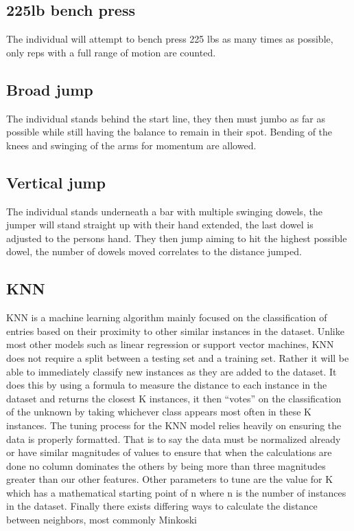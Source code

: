\documentclass[confrence]{IEEEtran}
\begin{document}
\subsection*{225lb bench press}
The individual will attempt to bench press 225 lbs as many times as possible, only reps with a full range of motion are counted.
\subsection*{Broad jump}
The individual stands behind the start line, they then must jumbo as far as possible while still having the balance to remain in their spot. Bending of the knees and swinging of the arms for momentum are allowed.
\subsection*{Vertical jump}
The individual stands underneath a bar with multiple swinging dowels, the jumper will stand straight up with their hand extended, the last dowel is adjusted to the persons hand. They then jump aiming to hit the highest possible dowel, the number of dowels moved correlates to the distance jumped.
\subsection*{KNN}
KNN is a machine learning algorithm mainly focused on the classification of entries based on their proximity to other similar instances in the dataset. 
Unlike most other models such as linear regression or support vector machines, KNN does not require a split between a testing set and a training set. 
Rather it will be able to immediately classify new instances as they are added to the dataset. 
It does this by using a formula to measure the distance to each instance in the dataset and returns the closest K instances, it then “votes” on the classification of the unknown by taking whichever class appears most often in these K instances. 
The tuning process for the KNN model relies heavily on ensuring the data is properly formatted. 
That is to say the data must be normalized already or have similar magnitudes of values to ensure that when the calculations are done no column dominates the others by being more than three magnitudes greater than our other features. 
Other parameters to tune are the value for K which has a mathematical starting point of n where n is the number of instances in the dataset. 
Finally there exists differing ways to calculate the distance between neighbors, most commonly Minkoski
\end{document}
